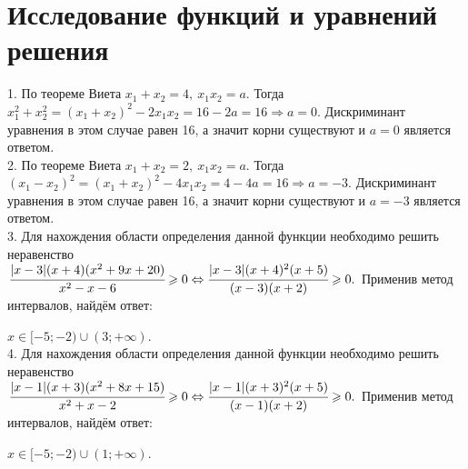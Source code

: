 \documentclass[12pt]{article}
\begin{document}
\section{Исследование функций и уравнений решения}
1. По теореме Виета $x_1+x_2=4,\ x_1x_2=a.$ Тогда $x_1^2+x_2^2=(x_1+x_2)^2-2x_1x_2=16-2a=16\Rightarrow a=0.$ Дискриминант уравнения в этом случае равен 16, а значит корни существуют и $a=0$ является ответом.\\
2. По теореме Виета $x_1+x_2=2,\ x_1x_2=a.$ Тогда $(x_1-x_2)^2=(x_1+x_2)^2-4x_1x_2=4-4a=16\Rightarrow a=-3.$ Дискриминант уравнения в этом случае равен 16, а значит корни существуют и $a=-3$ является ответом.\\
3. Для нахождения области определения данной функции необходимо решить неравенство\\ $\cfrac{|x-3|(x+4)(x^2+9x+20)}{x^2-x-6}\geqslant0\Leftrightarrow
\cfrac{|x-3|(x+4)^2(x+5)}{(x-3)(x+2)}\geqslant0.$ Применив метод интервалов, найдём ответ:
\begin{figure}[ht!]
\end{figure}
$x\in[-5;-2)\cup(3;+\infty).$\\
4. Для нахождения области определения данной функции необходимо решить неравенство\\ $\cfrac{|x-1|(x+3)(x^2+8x+15)}{x^2+x-2}\geqslant0\Leftrightarrow
\cfrac{|x-1|(x+3)^2(x+5)}{(x-1)(x+2)}\geqslant0.$ Применив метод интервалов, найдём ответ:
\begin{figure}[ht!]
\end{figure}
$x\in[-5;-2)\cup(1;+\infty).$\\
\end{document}
